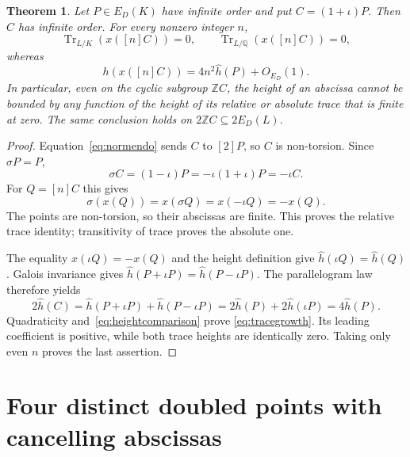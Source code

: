 \documentclass[11pt,a4paper]{article}
\newtheorem{theorem}{Theorem}[section]
\newcommand{\Q}{\mathbb Q}\newcommand{\Z}{\mathbb Z}
\DeclareMathOperator{\Tr}{Tr}\DeclareMathOperator{\rank}{rank}
\begin{document}
\begin{theorem}\label{thm:trace}
Let $P\in E_D(K)$ have infinite order and put $C=(1+\iota)P$.
Then $C$ has infinite order. For every nonzero integer $n$,
\begin{equation}\label{eq:zerotrace}
 \Tr_{L/K}(x([n]C))=0,
 \qquad \Tr_{L/\Q}(x([n]C))=0,
\end{equation}
whereas
\begin{equation}\label{eq:tracegrowth}
                 h(x([n]C))=4n^2\widehat h(P)+O_{E_D}(1).
\end{equation}
In particular, even on the cyclic subgroup $\Z C$, the height of
an abscissa cannot be bounded by any function of the height of
its relative or absolute trace that is finite at zero.
The same conclusion holds on $2\Z C\subseteq2E_D(L)$.
\end{theorem}
\begin{proof}
Equation~\eqref{eq:normendo} sends $C$ to $[2]P$, so $C$ is
non-torsion. Since $\sigma P=P$,
\[
 \sigma C=(1-\iota)P=-\iota(1+\iota)P=-\iota C.
\]
For $Q=[n]C$ this gives
\[
 \sigma(x(Q))=x(\sigma Q)=x(-\iota Q)=-x(Q).
\]
The points are non-torsion, so their abscissas are finite.
This proves the relative trace identity; transitivity of trace
proves the absolute one.

The equality $x(\iota Q)=-x(Q)$ and the height definition give
$\widehat h(\iota Q)=\widehat h(Q)$. Galois invariance gives
$\widehat h(P+\iota P)=\widehat h(P-\iota P)$.
The parallelogram law therefore yields
\[
 2\widehat h(C)
       =\widehat h(P+\iota P)+\widehat h(P-\iota P)
       =2\widehat h(P)+2\widehat h(\iota P)
       =4\widehat h(P).
\]
Quadraticity and~\eqref{eq:heightcomparison} prove
\eqref{eq:tracegrowth}. Its leading coefficient is positive,
while both trace heights are identically zero. Taking only even
$n$ proves the last assertion.
\end{proof}

\section{Four distinct doubled points with cancelling abscissas}
\end{document}
